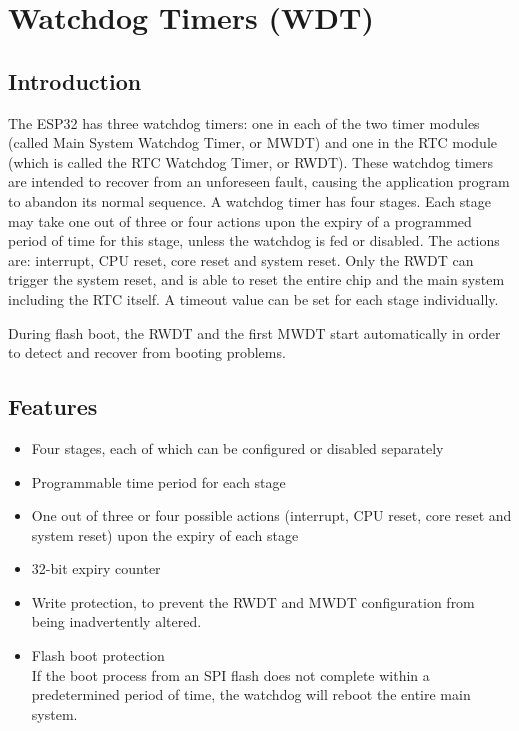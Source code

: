 \documentclass[main\_\_EN.tex]{subfiles}
\begin{document}
\setcounter{secnumdepth}{4}
\hypertarget{wdt}{}
\chapter{Watchdog Timers (WDT)}
\label{mod:wdt}

\section{Introduction}
The ESP32 has three watchdog timers: one in each of the two timer modules (called Main System Watchdog Timer, or MWDT) and one in the RTC module (which is called the RTC Watchdog Timer, or RWDT). These watchdog timers are intended to recover from an unforeseen fault, causing the application program to abandon its normal sequence. A watchdog timer has four stages. Each stage may take one out of three or four actions upon the expiry of a programmed period of time for this stage, unless the watchdog is fed or disabled. The actions are: interrupt, CPU reset, core reset and system reset. Only the RWDT can trigger the system reset, and is able to reset the entire chip and the main system including the RTC itself. A timeout value can be set for each stage individually.

During flash boot, the RWDT and the first MWDT start automatically in order to detect and recover from booting problems.

\section{Features}
\begin{itemize}
    \item Four stages, each of which can be configured or disabled separately 
    \item Programmable time period for each stage
    \item One out of three or four possible actions (interrupt, CPU reset, core reset and system reset) upon the expiry of each stage
    \item 32-bit  expiry counter
    \item Write protection, to prevent the RWDT and MWDT configuration from being inadvertently altered.
    \item Flash boot protection\\
    If the boot process from an SPI flash does not complete within a predetermined period of time, the watchdog will reboot the entire main system.
\end{itemize}
\end{document}
